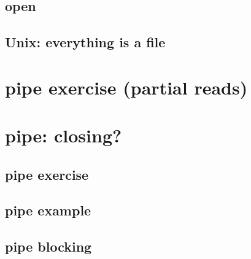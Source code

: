

\subsection{open}



\subsection{Unix: everything is a file}



\section{pipe exercise (partial reads)}


\section{pipe: closing?}


\subsection{pipe exercise}


\subsection{pipe example}


\subsection{pipe blocking}

